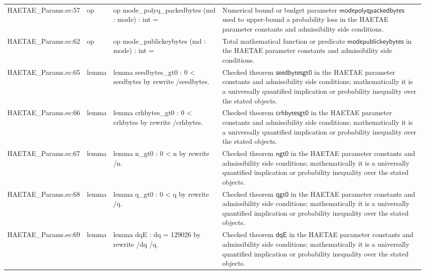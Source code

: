 \documentclass[10pt]{article}
\begin{document}
\begin{longtable}{L{0.11\textwidth}L{0.055\textwidth}L{0.385\textwidth}L{0.41\textwidth}}
HAETAE\_\allowbreak{}Params.\allowbreak{}ec:\allowbreak{}57 & op & {\ttfamily\scriptsize op mode\_\allowbreak{}polyq\_\allowbreak{}packedbytes (md : mode) : int =} & Numerical bound or budget parameter $\mathsf{modepolyqpackedbytes}$ used to upper-bound a probability loss in the HAETAE parameter constants and admissibility side conditions. \\
HAETAE\_\allowbreak{}Params.\allowbreak{}ec:\allowbreak{}62 & op & {\ttfamily\scriptsize op mode\_\allowbreak{}publickeybytes (md : mode) : int =} & Total mathematical function or predicate $\mathsf{modepublickeybytes}$ in the HAETAE parameter constants and admissibility side conditions. \\
HAETAE\_\allowbreak{}Params.\allowbreak{}ec:\allowbreak{}65 & lemma & {\ttfamily\scriptsize lemma seedbytes\_\allowbreak{}gt0 : 0 \textless{} seedbytes by rewrite /seedbytes.} & Checked theorem $\mathsf{seedbytesgt0}$ in the HAETAE parameter constants and admissibility side conditions; mathematically it is a universally quantified implication or probability inequality over the stated objects. \\
HAETAE\_\allowbreak{}Params.\allowbreak{}ec:\allowbreak{}66 & lemma & {\ttfamily\scriptsize lemma crhbytes\_\allowbreak{}gt0 : 0 \textless{} crhbytes by rewrite /crhbytes.} & Checked theorem $\mathsf{crhbytesgt0}$ in the HAETAE parameter constants and admissibility side conditions; mathematically it is a universally quantified implication or probability inequality over the stated objects. \\
HAETAE\_\allowbreak{}Params.\allowbreak{}ec:\allowbreak{}67 & lemma & {\ttfamily\scriptsize lemma n\_\allowbreak{}gt0 : 0 \textless{} n by rewrite /n.} & Checked theorem $\mathsf{ngt0}$ in the HAETAE parameter constants and admissibility side conditions; mathematically it is a universally quantified implication or probability inequality over the stated objects. \\
HAETAE\_\allowbreak{}Params.\allowbreak{}ec:\allowbreak{}68 & lemma & {\ttfamily\scriptsize lemma q\_\allowbreak{}gt0 : 0 \textless{} q by rewrite /q.} & Checked theorem $\mathsf{qgt0}$ in the HAETAE parameter constants and admissibility side conditions; mathematically it is a universally quantified implication or probability inequality over the stated objects. \\
HAETAE\_\allowbreak{}Params.\allowbreak{}ec:\allowbreak{}69 & lemma & {\ttfamily\scriptsize lemma dqE : dq = 129026 by rewrite /dq /q.} & Checked theorem $\mathsf{dqE}$ in the HAETAE parameter constants and admissibility side conditions; mathematically it is a universally quantified implication or probability inequality over the stated objects. \\

\end{longtable}
\end{document}
